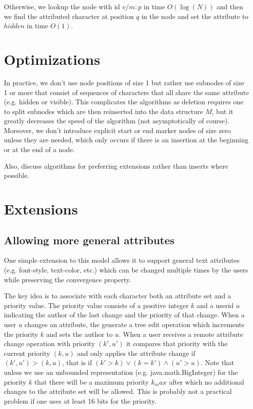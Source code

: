 \documentclass{amsart}
\begin{document}
Otherwise, we lookup the node with id $v/m:p$ in time $O(\log(N))$ and
then we find the attributed character at position $q$ in the node
and set the attribute to $hidden$ in time $O(1)$.


\newpage
\section{Optimizations}
In practice, we don't use node positions of size 1 but rather use subnodes
of size 1 or more that consist of sequences of characters that all share the
same attribute (e.g. hidden or visible). This complicates the algorithms
as deletion requires one to split subnodes which are then reinserted into
the data structure $M$, but it greatly decreases the speed of the algorithm
(not asymptotically of course). Moreover, we don't introduce explicit
start or end marker nodes of size zero unless they are needed, which only
occurs if there is an insertion at the beginning or at the end of a node.

Also, discuss algorithms for preferring extensions rather than
inserts where possible.

\newpage
\section{Extensions}
\subsection{Allowing more general attributes}
One simple extension to this model allows it to support general text attributes
(e.g. font-style, text-color, etc.) which can be changed multiple times by
the users while preserving the convergence property.

The key idea is to associate with each character both an attribute set and a
priority value. The priority value consists of a positive integer $k$ and a userid $u$
indicating the author of the last change and the priority of that change. 
When a user $u$ changes an attribute, the generate a tree edit operation which
increments the priority $k$ and sets the author to $u$. When a user receives
a remote attribute change operation with priority $(k',u')$ it compares that
priority with the current priority $(k,u)$ and only applies the attribute
change if $(k',u') > (k,u)$, that is if $(k'>k) \vee (k=k')\wedge(u'>u)$.
Note that unless we use an unbounded representation (e.g. java.math.BigInteger)
for the priority $k$
that there will be a maximum priority $k_max$ after which no additional
changes to the attribute set will be allowed. This is probably not a practical
problem if one uses at least 16 bits for the priority.
\end{document}
